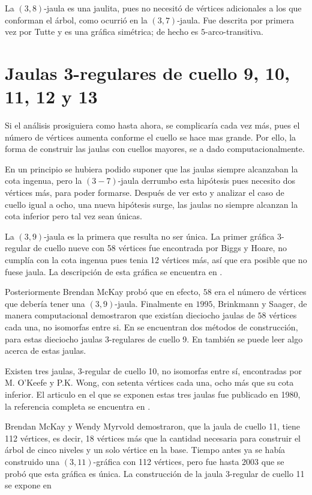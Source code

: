 \documentclass[12pt]{book}
\theoremstyle{definition}
\begin{document}
La $(3,8)$-jaula es una jaulita, pues no necesitó
de vértices adicionales a los que conforman el árbol, como ocurrió en la $(3,7)$-jaula. Fue
descrita por primera vez por Tutte y es una gráfica simétrica; de
hecho es $5$-arco-transitiva.

\section{Jaulas 3-regulares de cuello 9, 10, 11, 12 y 13 }

Si el análisis prosiguiera como hasta ahora, se complicaría cada vez
más, pues el número de vértices aumenta conforme el cuello se hace mas
grande. Por ello, la forma de construir las jaulas con cuellos
mayores, se a dado computacionalmente.

En un principio se hubiera podido suponer que las jaulas siempre
alcanzaban la cota ingenua, pero la $(3-7)$-jaula derrumbo esta
hipótesis pues necesito dos vértices más, para poder
formarse. Después de ver esto y analizar el caso de cuello igual a
ocho, una nueva hipótesis surge, las jaulas no siempre alcanzan la
cota inferior pero tal vez sean únicas.

La $(3,9)$-jaula es la primera que resulta no ser única. La primer
gráfica 3-regular de cuello nueve con 58 vértices
fue encontrada por Biggs y Hoare, no cumplía con la cota ingenua pues
tenia 12 vértices más, así que era posible que no fuese jaula. La
descripción de esta gráfica se encuentra en \cite{primerascuello9}.

Posteriormente Brendan McKay probó que en efecto, $58$ era
el número de vértices que debería tener una $(3,9)$-jaula. Finalmente en $1995$, Brinkmann y Saager, de manera computacional
demostraron que existían dieciocho jaulas de $58$ vértices cada una,
no isomorfas entre si. En \cite{cuello9} se encuentran dos métodos de
construcción, para estas dieciocho jaulas 3-regulares de cuello 9. En
\cite{cuello9y11} también se puede leer algo acerca de estas jaulas.

Existen tres jaulas, 3-regular de cuello 10, no isomorfas entre sí,
encontradas por M. O'Keefe y P.K. Wong, con setenta vértices cada una,
ocho más que su cota inferior. El articulo en el que se exponen estas
tres jaulas fue publicado en 1980, la referencia completa se encuentra
en \cite{cuello10}.

Brendan McKay y Wendy Myrvold demostraron, que la jaula de cuello
11, tiene 112 vértices, es decir, 18 vértices más
que la cantidad necesaria para construir el árbol de cinco niveles y
un solo vértice en la base. Tiempo antes ya se
había construido una $(3,11)$-gráfica con 112 vértices, pero fue hasta
$2003$ que se probó que esta gráfica es única. La construcción de la
jaula 3-regular de cuello 11 se expone en \cite{cuello9y11}
\end{document}
